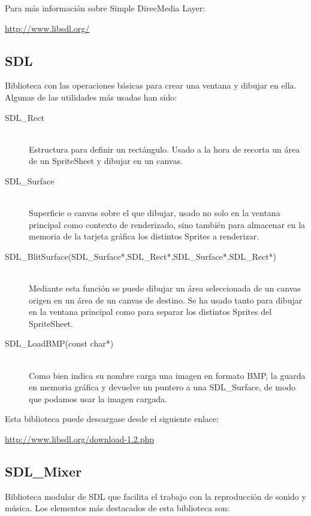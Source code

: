 \documentclass[parskip=half*]{scrartcl}
\begin{document}
Para m\'as información sobre Simple DirecMedia Layer: \\

\centerline{\url{http://www.libsdl.org/}}

	\subsection{SDL}
	Biblioteca con las operaciones b\'asicas para crear una ventana y dibujar en ella. Algunas de las utilidades m\'as usadas han sido:
	\begin{description}
		\item[SDL\_Rect] \hfill \\		Estructura para definir un rect\'angulo. Usado a la hora de recorta un \'area de un SpriteSheet y dibujar en un canvas.
		
		\item[SDL\_Surface] \hfill \\	Superficie o canvas sobre el que dibujar, usado no solo en la ventana principal como contexto de renderizado, sino tambi\'en para almacenar en la memoria de la tarjeta gr\'afica los distintos Sprites a renderizar.
		
		\item[SDL\_BlitSurface(SDL\_Surface*,SDL\_Rect*,SDL\_Surface*,SDL\_Rect*)] \hfill \\ Mediante esta funci\'on se puede dibujar un \'area seleccionada de un canvas origen en un \'area de un canvas de destino. Se ha usado tanto para dibujar en la ventana principal como para separar los distintos Sprites del SpriteSheet.

		\item[SDL\_LoadBMP(const char*)] \hfill \\	Como bien indica su nombre carga una imagen en formato BMP, la guarda en memoria gr\'afica y devuelve un puntero a una SDL\_Surface, de modo que podamos usar la imagen cargada.
	\end{description}

	Esta biblioteca puede descargase desde el siguiente enlace: \\

	\centerline{\url{http://www.libsdl.org/download-1.2.php}}
	\subsection{SDL\_Mixer}
	Biblioteca modular de SDL que facilita el trabajo con la reproducci\'on de sonido y m\'usica. Los elementos m\'as destacados de esta biblioteca son:
\end{document}
